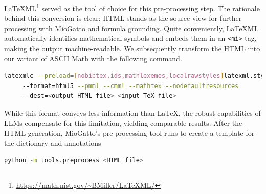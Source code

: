 \LaTeX ML\footnote{\url{https://math.nist.gov/~BMiller/LaTeXML/}} \citep{ginev2011latexml} served as the tool of choice for this pre-processing step. The rationale behind this conversion is clear: HTML stands as the source view for further processing with MioGatto and formula grounding. Quite conveniently, \LaTeX ML automatically identifies mathematical symbols and embeds them in an \lstinline{<mi>} tag, making the output machine-readable. We subsequently transform the HTML into our variant of ASCII Math with the following command.

\begin{lstlisting}[language=bash]
latexmlc --preload=[nobibtex,ids,mathlexemes,localrawstyles]latexml.sty
     --format=html5 --pmml --cmml --mathtex --nodefaultresources 
     --dest=<output HTML file> <input TeX file>
\end{lstlisting}

While this format conveys less information than \LaTeX, the robust capabilities of LLMs compensate for this limitation, yielding comparable results. After the HTML generation, MioGatto's pre-processing tool runs to create a template for the dictionary and annotations
  \begin{lstlisting}[language=bash]
    python -m tools.preprocess <HTML file>
  \end{lstlisting}



